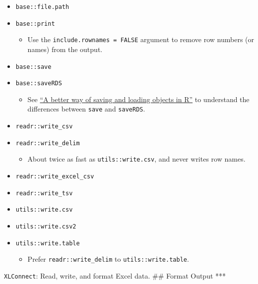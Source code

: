 \documentclass[
]{book}
\providecommand{\tightlist}{%
  \setlength{\itemsep}{0pt}\setlength{\parskip}{0pt}}
\begin{document}
\begin{itemize}
\tightlist
\item
  \texttt{base::file.path}
\item
  \texttt{base::print}

  \begin{itemize}
  \tightlist
  \item
    Use the \texttt{include.rownames\ =\ FALSE} argument to remove row numbers (or names) from the output.
  \end{itemize}
\item
  \texttt{base::save}
\item
  \texttt{base::saveRDS}

  \begin{itemize}
  \tightlist
  \item
    See \href{https://www.fromthebottomoftheheap.net/2012/04/01/saving-and-loading-r-objects/}{``A better way of saving and loading objects in R''} to understand the differences between \texttt{save} and \texttt{saveRDS}.
  \end{itemize}
\item
  \texttt{readr::write\_csv}
\item
  \texttt{readr::write\_delim}

  \begin{itemize}
  \tightlist
  \item
    About twice as fast as \texttt{utils::write.csv}, and never writes row names.
  \end{itemize}
\item
  \texttt{readr::write\_excel\_csv}
\item
  \texttt{readr::write\_tsv}
\item
  \texttt{utils::write.csv}
\item
  \texttt{utils::write.csv2}
\item
  \texttt{utils::write.table}

  \begin{itemize}
  \tightlist
  \item
    Prefer \texttt{readr::write\_delim} to \texttt{utils::write.table}.
  \end{itemize}
\end{itemize}

\texttt{XLConnect}: Read, write, and format Excel data.
\#\# Format Output
***
\end{document}
